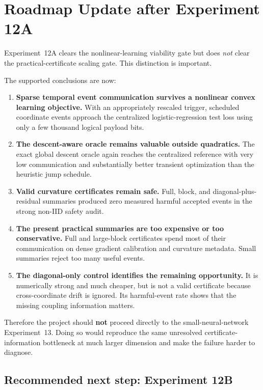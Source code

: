 \section{Roadmap Update after Experiment 12A}
\label{sec:roadmap-post-12a}

Experiment~12A clears the nonlinear-learning viability gate but does \emph{not} clear the practical-certificate scaling gate. This distinction is important.

The supported conclusions are now:
\begin{enumerate}
  \item \textbf{Sparse temporal event communication survives a nonlinear convex learning objective.} With an appropriately rescaled trigger, scheduled coordinate events approach the centralized logistic-regression test loss using only a few thousand logical payload bits.
  \item \textbf{The descent-aware oracle remains valuable outside quadratics.} The exact global descent oracle again reaches the centralized reference with very low communication and substantially better transient optimization than the heuristic jump schedule.
  \item \textbf{Valid curvature certificates remain safe.} Full, block, and diagonal-plus-residual summaries produced zero measured harmful accepted events in the strong non-IID safety audit.
  \item \textbf{The present practical summaries are too expensive or too conservative.} Full and large-block certificates spend most of their communication on dense gradient calibration and curvature metadata. Small summaries reject too many useful events.
  \item \textbf{The diagonal-only control identifies the remaining opportunity.} It is numerically strong and much cheaper, but is not a valid certificate because cross-coordinate drift is ignored. Its harmful-event rate shows that the missing coupling information matters.
\end{enumerate}

Therefore the project should \textbf{not} proceed directly to the small-neural-network Experiment~13. Doing so would reproduce the same unresolved certificate-information bottleneck at much larger dimension and make the failure harder to diagnose.

\subsection{Recommended next step: Experiment 12B}

